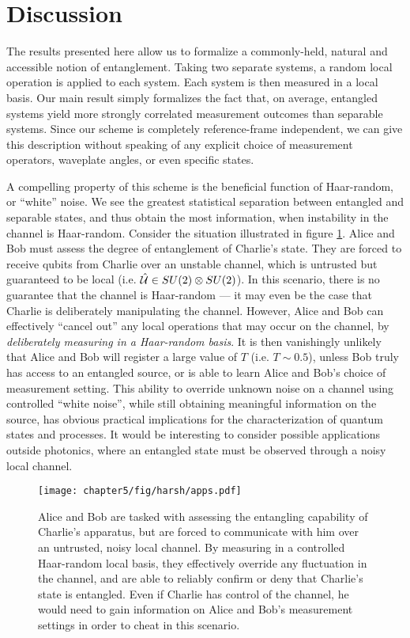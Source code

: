 \section{Discussion}
The results presented here allow us to formalize a commonly-held, natural and accessible notion of entanglement. Taking two separate systems, a random local operation is applied to each system. Each system is then measured in a local basis. Our main result simply formalizes the fact that, on average, entangled systems yield more strongly correlated measurement outcomes than separable systems. Since our scheme is completely reference-frame independent, we can give this description without speaking of any explicit choice of measurement operators, waveplate angles, or even specific states. 

A compelling property of this scheme is the beneficial function of Haar-random, or ``white'' noise. We see the greatest statistical separation between entangled and separable states, and thus obtain the most information, when instability in the channel is Haar-random. Consider the situation illustrated in figure \ref{fig:apps}. Alice and Bob must assess the degree of entanglement of Charlie's state. They are forced to receive qubits from Charlie over an unstable channel, which is untrusted but guaranteed to be local (i.e. $\hat{\mathcal{U}} \in SU(2) \otimes SU(2)$). In this scenario, there is no guarantee that the channel is Haar-random --- it may even be the case that Charlie is deliberately manipulating the channel. However, Alice and Bob can effectively ``cancel out'' any local operations that may occur on the channel, by \emph{deliberately measuring in a Haar-random basis}. It is then vanishingly unlikely that Alice and Bob will register a large value of $T$ (i.e. $T\sim0.5$), unless Bob truly has access to an entangled source, or is able to learn Alice and Bob's choice of measurement setting. This ability to override unknown noise on a channel using controlled ``white noise'', while still obtaining meaningful information on the source, has obvious practical implications for the characterization of quantum states and processes. It would be interesting to consider possible applications outside photonics, where an entangled state must be observed through a noisy local channel.

\begin{figure}[t!]
\centering
\texttt{[image: chapter5/fig/harsh/apps.pdf]}
\caption[Potential applications]{
Alice and Bob are tasked with assessing the entangling capability of Charlie's apparatus, but are forced to communicate with him over an untrusted, noisy local channel. By measuring in a controlled Haar-random local basis, they effectively override any fluctuation in the channel, and are able to reliably confirm or deny that Charlie's state is entangled. Even if Charlie has control of the channel, he would need to gain information on Alice and Bob's measurement settings in order to cheat in this scenario.
}
\label{fig:apps}
\end{figure}


